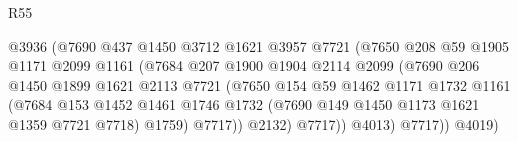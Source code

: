 \begin{lexlean}{R55}
\begin{coremodule}
                                        @3936
                                        (@7690
                                          @437
                                          @1450
                                          @3712
                                          @1621
                                          @3957
                                          @7721
                                          (@7650
                                            @208
                                            @59
                                            @1905
                                            @1171
                                            @2099
                                            @1161
                                            (@7684
                                              @207
                                              @1900
                                              @1904
                                              @2114
                                              @2099
                                              (@7690
                                                @206
                                                @1450
                                                @1899
                                                @1621
                                                @2113
                                                @7721
                                                (@7650
                                                  @154
                                                  @59
                                                  @1462
                                                  @1171
                                                  @1732
                                                  @1161
                                                  (@7684
                                                    @153
                                                    @1452
                                                    @1461
                                                    @1746
                                                    @1732
                                                    (@7690 @149 @1450 @1173 @1621 @1359 @7721 @7718)
                                                    @1759)
                                                  @7717))
                                              @2132)
                                            @7717))
                                        @4013)
                                      @7717))
                                  @4019)

\end{coremodule}
\end{lexlean}
